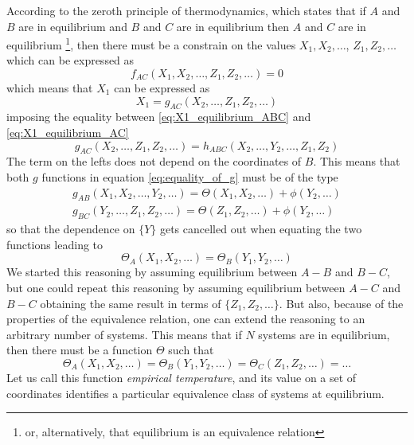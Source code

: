 According to the zeroth principle of thermodynamics, which states that if $A$ and $B$ are in equilibrium and $B$ and $C$ are in equilibrium then $A$ and $C$ are in equilibrium 
\footnote{or, alternatively, that equilibrium is an equivalence relation}, then
there must be a constrain on the values ${X_1, X_2, \dots}$, ${Z_1, Z_2, \dots}$ which can be expressed as 
\begin{equation*}
    f_{AC} (X_1, X_2, \dots, Z_1, Z_2, \dots) = 0
\end{equation*}
which means that $X_1$ can be expressed as
\begin{equation}
    X_1 = g_{AC} (X_2, \dots, Z_1, Z_2, \dots)
    \label{eq:X1_equilibrium_AC}
\end{equation}
imposing the equality between \ref{eq:X1_equilibrium_ABC} and \ref{eq:X1_equilibrium_AC}
\begin{equation*}
    g_{AC} (X_2, \dots, Z_1, Z_2, \dots) = h_{ABC}(X_2, \dots, Y_2, \dots, Z_1, Z_2)
\end{equation*}
The term on the lefts does not depend on the coordinates of $B$. This means that both $g$ functions in equation \ref{eq:equality_of_g} must be of the type
\begin{gather*}
    g_{AB}(X_1, X_2, \dots, Y_2, \dots) = \Theta(X_1, X_2, \dots) + \phi(Y_2, \dots) \\
    g_{BC}(Y_2, \dots, Z_1, Z_2, \dots) = \Theta(Z_1, Z_2, \dots) + \phi(Y_2, \dots)
\end{gather*}
so that the dependence on $\{Y\}$ gets cancelled out when equating the two functions leading to 
\begin{equation*}
    \Theta_A(X_1, X_2, \dots) = \Theta_B(Y_1, Y_2, \dots)
\end{equation*}
We started this reasoning by assuming equilibrium between $A-B$ and $B-C$, but one could repeat this reasoning by assuming
equilibrium between $A-C$ and $B-C$ obtaining the same result in terms of $\{Z_1, Z_2, \dots\}$. But also, because of the properties of the equivalence relation,
one can extend the reasoning to an arbitrary number of systems. This means that if $N$ systems are in equilibrium, then there must be a function $\Theta$ such that
\begin{equation*}
    \Theta_A(X_1, X_2, \dots) = \Theta_B(Y_1, Y_2, \dots) = \Theta_C(Z_1, Z_2, \dots) = \dots
\end{equation*}
Let us call this function \emph{empirical temperature}, and its value on a set of coordinates identifies a particular equivalence class of systems at equilibrium. \\
